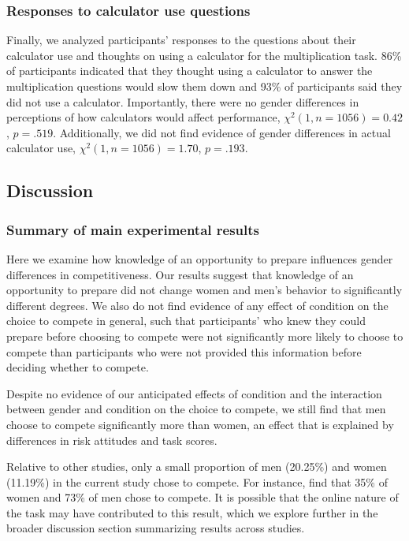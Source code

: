 \documentclass[a4paper, nobind]{templates/ociamthesis}
\begin{document}
\hypertarget{responses-to-calculator-use-questions}{%
\subsubsection{Responses to calculator use questions}\label{responses-to-calculator-use-questions}}

Finally, we analyzed participants' responses to the questions about their calculator use and thoughts on using a calculator for the multiplication task. 86\% of participants indicated that they thought using a calculator to answer the multiplication questions would slow them down and 93\% of participants said they did not use a calculator. Importantly, there were no gender differences in perceptions of how calculators would affect performance, \(\chi^2(1, n = 1056) = 0.42\), \(p = .519\). Additionally, we did not find evidence of gender differences in actual calculator use, \(\chi^2(1, n = 1056) = 1.70\), \(p = .193\).

\hypertarget{discussion}{%
\subsection{Discussion}\label{discussion}}

\hypertarget{summary-of-main-experimental-results}{%
\subsubsection{Summary of main experimental results}\label{summary-of-main-experimental-results}}

Here we examine how knowledge of an opportunity to prepare influences gender differences in competitiveness. Our results suggest that knowledge of an opportunity to prepare did not change women and men's behavior to significantly different degrees. We also do not find evidence of any effect of condition on the choice to compete in general, such that participants' who knew they could prepare before choosing to compete were not significantly more likely to choose to compete than participants who were not provided this information before deciding whether to compete.

Despite no evidence of our anticipated effects of condition and the interaction between gender and condition on the choice to compete, we still find that men choose to compete significantly more than women, an effect that is explained by differences in risk attitudes and task scores.

Relative to other studies, only a small proportion of men (20.25\%) and women (11.19\%) in the current study chose to compete. For instance, \textcite{Niederle2007} find that 35\% of women and 73\% of men chose to compete. It is possible that the online nature of the task may have contributed to this result, which we explore further in the broader discussion section summarizing results across studies.
\end{document}

